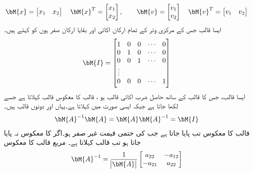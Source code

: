 \begin{gather*}
\begin{aligned}
\bM{x}=
\begin{bmatrix}
x_1& x_2
\end{bmatrix} \quad
\bM{x}^T=
\begin{bmatrix}
x_1\\
x_2
\end{bmatrix}, \quad \quad
\bM{v}=
\begin{bmatrix}
v_1\\
v_2
\end{bmatrix}\quad
\bM{v}^T=
\begin{bmatrix}
v_1 & v_2
\end{bmatrix}
\end{aligned}
\end{gather*}
 ایسا  قالب جس کے مرکزی وتر کے تمام ارکان اکائی   اور بقایا  ارکان صفر ہوں کو   کہتے ہیں۔
\begin{align}
\bM{I}=
\begin{bmatrix}
1&0 &0 & \cdots &0\\
0&1&0&\cdots & 0\\
0&0&1&\cdots &0\\
\vdots &&&&\\
0&0&0&\cdots&1
\end{bmatrix}
\end{align}
ایسا  قالب، جس کا  قالب کے ساتھ حاصل ضرب اکائی قالب ہو ،   قالب  کا معکوس قالب کہلاتا ہے جسے  لکھا جاتا ہے جبکہ ایسی صورت میں   کہلاتا ہے۔یہاں  اور  دونوں  قالب ہیں۔
\begin{align}
\bM{A}^{-1}\bM{A}=\bM{A}\bM{A}^{-1}=\bM{I}
\end{align}
قالب  کا معکوس تب پایا جاتا ہے جب  کی حتمی قیمت غیر صفر ہو۔اگر  کا معکوس نہ پایا جاتا ہو تب   قالب کہلاتا ہے۔ مربع  قالب کا معکوس
\begin{align}
\bM{A}^{-1}=\frac{1}{\abs{\bM{A}}}
\begin{bmatrix}
a_{22}& -a_{12}\\
-a_{21}& a_{22}
\end{bmatrix}
\end{align}
